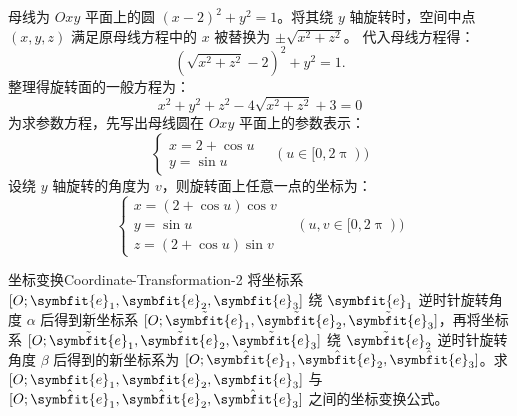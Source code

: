 \begin{solution}
    母线为 $Oxy$ 平面上的圆 $(x - 2)^2 + y^2 = 1$。将其绕 $y$ 轴旋转时，空间中点 $(x, y, z)$ 满足原母线方程中的 $x$ 被替换为 $\pm \sqrt{x^2 + z^2}$。
    代入母线方程得：
    \begin{equation}
        (\sqrt{x^2 + z^2} - 2)^2 + y^2 = 1.
    \end{equation}
    整理得旋转面的一般方程为：
    \begin{equation}
        \boxed{x^2 + y^2 + z^2 - 4\sqrt{x^2 + z^2} + 3 = 0}
    \end{equation}
    为求参数方程，先写出母线圆在 $Oxy$ 平面上的参数表示：
    \begin{equation}
        \begin{cases}
            x = 2 + \cos u \\
            y = \sin u
        \end{cases} \quad (u \in [0, 2\uppi))
    \end{equation}
    设绕 $y$ 轴旋转的角度为 $v$，则旋转面上任意一点的坐标为：
    \begin{equation}
        \boxed{\begin{cases}
            x = (2 + \cos u) \cos v \\
            y = \sin u              \\
            z = (2 + \cos u) \sin v
        \end{cases} \quad (u, v \in [0, 2\uppi))}
    \end{equation}
\end{solution}


\begin{problem}{坐标变换}{Coordinate-Transformation-2}
    将坐标系 $[O; \symbfit{e}_1, \symbfit{e}_2, \symbfit{e}_3]$ 绕 $\symbfit{e}_1$ 逆时针旋转角度 $\alpha$ 后得到新坐标系 $[O; \tilde{\symbfit{e}}_1, \tilde{\symbfit{e}}_2, \tilde{\symbfit{e}}_3]$，再将坐标系 $[O; \tilde{\symbfit{e}}_1, \tilde{\symbfit{e}}_2, \tilde{\symbfit{e}}_3]$ 绕 $\tilde{\symbfit{e}}_2$ 逆时针旋转角度 $\beta$ 后得到的新坐标系为 $[O; \hat{\symbfit{e}}_1, \hat{\symbfit{e}}_2, \hat{\symbfit{e}}_3]$。求 $[O; \symbfit{e}_1, \symbfit{e}_2, \symbfit{e}_3]$ 与 $[O; \hat{\symbfit{e}}_1, \hat{\symbfit{e}}_2, \hat{\symbfit{e}}_3]$ 之间的坐标变换公式。
\end{problem}

